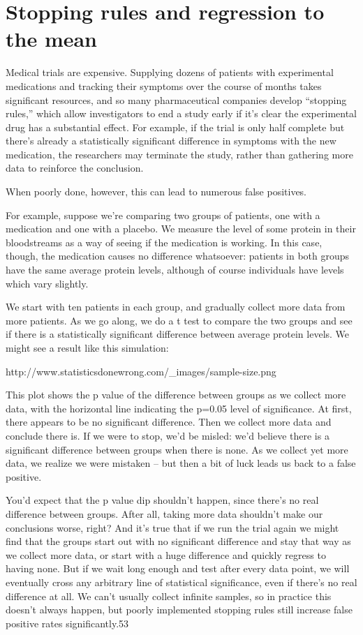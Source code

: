 \chapter{Stopping rules and regression to the mean}
\label{chp7}


Medical trials are expensive. Supplying dozens of patients with experimental medications and tracking their symptoms over the course of months takes significant resources, and so many pharmaceutical companies develop “stopping rules,” which allow investigators to end a study early if it’s clear the experimental drug has a substantial effect. For example, if the trial is only half complete but there’s already a statistically significant difference in symptoms with the new medication, the researchers may terminate the study, rather than gathering more data to reinforce the conclusion.

When poorly done, however, this can lead to numerous false positives.

For example, suppose we’re comparing two groups of patients, one with a medication and one with a placebo. We measure the level of some protein in their bloodstreams as a way of seeing if the medication is working. In this case, though, the medication causes no difference whatsoever: patients in both groups have the same average protein levels, although of course individuals have levels which vary slightly.

We start with ten patients in each group, and gradually collect more data from more patients. As we go along, we do a t test to compare the two groups and see if there is a statistically significant difference between average protein levels. We might see a result like this simulation:

http://www.statisticsdonewrong.com/_images/sample-size.png


This plot shows the p value of the difference between groups as we collect more data, with the horizontal line indicating the p=0.05 level of significance. At first, there appears to be no significant difference. Then we collect more data and conclude there is. If we were to stop, we’d be misled: we’d believe there is a significant difference between groups when there is none. As we collect yet more data, we realize we were mistaken – but then a bit of luck leads us back to a false positive.

You’d expect that the p value dip shouldn’t happen, since there’s no real difference between groups. After all, taking more data shouldn’t make our conclusions worse, right? And it’s true that if we run the trial again we might find that the groups start out with no significant difference and stay that way as we collect more data, or start with a huge difference and quickly regress to having none. But if we wait long enough and test after every data point, we will eventually cross any arbitrary line of statistical significance, even if there’s no real difference at all. We can’t usually collect infinite samples, so in practice this doesn’t always happen, but poorly implemented stopping rules still increase false positive rates significantly.53

